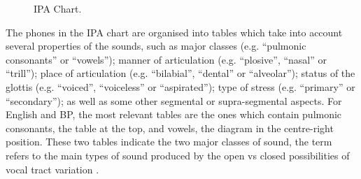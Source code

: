 \begin{figure}[!ht]
        \noindent{}
        \caption{IPA Chart.}\label{fig:ipa-chart}
\end{figure}


The phones in the \ac{IPA} chart are organised into tables which take into account several properties of the sounds, such as major classes (e.g. ``pulmonic consonants'' or ``vowels''); manner of articulation (e.g. ``plosive'', ``nasal'' or ``trill''); place of articulation (e.g. ``bilabial'', ``dental'' or ``alveolar''); status of the glottis (e.g. ``voiced'', ``voiceless'' or ``aspirated''); type of stress (e.g. ``primary'' or ``secondary''); as well as some other segmental or supra-segmental aspects. For English and \gls{BP}, the most relevant tables are the ones which contain pulmonic consonants, the table at the top, and vowels, the diagram in the centre-right position. These two tables indicate the two major classes of sound, the term refers to the main types of sound produced by the open vs closed possibilities of vocal tract variation \cite{Crystal2011}.

